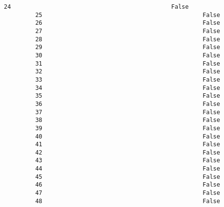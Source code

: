\documentclass[11pt]{article}
\begin{document}
\begin{Verbatim}[commandchars=\\\{\}]
         24                                              False                                    
         25                                              False                                    
         26                                              False                                    
         27                                              False                                    
         28                                              False                                    
         29                                              False                                    
         30                                              False                                    
         31                                              False                                    
         32                                              False                                    
         33                                              False                                    
         34                                              False                                    
         35                                              False                                    
         36                                              False                                    
         37                                              False                                    
         38                                              False                                    
         39                                              False                                    
         40                                              False                                    
         41                                              False                                    
         42                                              False                                    
         43                                              False                                    
         44                                              False                                    
         45                                              False                                    
         46                                              False                                    
         47                                              False                                    
         48                                              False                                    
         

\end{Verbatim}
\end{document}
